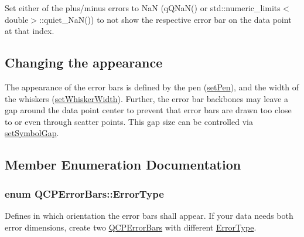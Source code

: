 Set either of the plus/minus errors to NaN ({\ttfamily q\+Q\+Na\+N()} or {\ttfamily std\+::numeric\+\_\+limits$<$double$>$\+::quiet\+\_\+\+Na\+N()}) to not show the respective error bar on the data point at that index.\hypertarget{classQCPErrorBars_qcperrorbars-appearance}{}\subsection{Changing the appearance}\label{classQCPErrorBars_qcperrorbars-appearance}
The appearance of the error bars is defined by the pen (\hyperlink{classQCPAbstractPlottable_ab74b09ae4c0e7e13142fe4b5bf46cac7}{set\+Pen}), and the width of the whiskers (\hyperlink{classQCPErrorBars_ad05f6ff9e46c6047f1cd2459744b7b59}{set\+Whisker\+Width}). Further, the error bar backbones may leave a gap around the data point center to prevent that error bars are drawn too close to or even through scatter points. This gap size can be controlled via \hyperlink{classQCPErrorBars_a280ee8d863d8a2630c309701d019b3de}{set\+Symbol\+Gap}. 

\subsection{Member Enumeration Documentation}
\subsubsection[{\texorpdfstring{Error\+Type}{ErrorType}}]{\setlength{\rightskip}{0pt plus 5cm}enum {\bf Q\+C\+P\+Error\+Bars\+::\+Error\+Type}}\hypertarget{classQCPErrorBars_a95f0220f11a72648b96480a85ce26474}{}\label{classQCPErrorBars_a95f0220f11a72648b96480a85ce26474}
Defines in which orientation the error bars shall appear. If your data needs both error dimensions, create two \hyperlink{classQCPErrorBars}{Q\+C\+P\+Error\+Bars} with different \hyperlink{classQCPErrorBars_a95f0220f11a72648b96480a85ce26474}{Error\+Type}.

